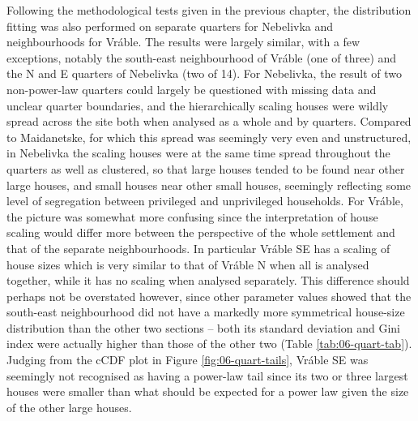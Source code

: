 \documentclass[
  12pt,
]{book}
\begin{document}
Following the methodological tests given in the previous chapter, the distribution fitting was also performed on separate quarters for Nebelivka and neighbourhoods for Vráble. The results were largely similar, with a few exceptions, notably the south-east neighbourhood of Vráble (one of three) and the N and E quarters of Nebelivka (two of 14). For Nebelivka, the result of two non-power-law quarters could largely be questioned with missing data and unclear quarter boundaries, and the hierarchically scaling houses were wildly spread across the site both when analysed as a whole and by quarters. Compared to Maidanetske, for which this spread was seemingly very even and unstructured, in Nebelivka the scaling houses were at the same time spread throughout the quarters as well as clustered, so that large houses tended to be found near other large houses, and small houses near other small houses, seemingly reflecting some level of segregation between privileged and unprivileged households. For Vráble, the picture was somewhat more confusing since the interpretation of house scaling would differ more between the perspective of the whole settlement and that of the separate neighbourhoods. In particular Vráble SE has a scaling of house sizes which is very similar to that of Vráble N when all is analysed together, while it has no scaling when analysed separately. This difference should perhaps not be overstated however, since other parameter values showed that the south-east neighbourhood did not have a markedly more symmetrical house-size distribution than the other two sections -- both its standard deviation and Gini index were actually higher than those of the other two (Table \ref{tab:06-quart-tab}). Judging from the cCDF plot in Figure \ref{fig:06-quart-tails}, Vráble SE was seemingly not recognised as having a power-law tail since its two or three largest houses were smaller than what should be expected for a power law given the size of the other large houses.
\end{document}

